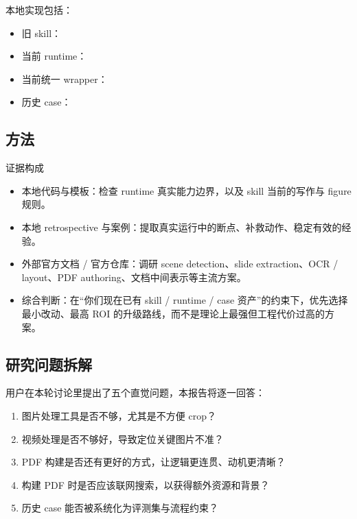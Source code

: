 \documentclass[a4paper]{article}
\begin{document}
本地实现包括：

\begin{itemize}
\item 旧 skill：
\item 当前 runtime：
\item 当前统一 wrapper：
\item 历史 case：
\end{itemize}

\subsection{方法}

\begin{methodbox}{证据构成}
\begin{itemize}
\item 本地代码与模板：检查 runtime 真实能力边界，以及 skill 当前的写作与 figure 规则。
\item 本地 retrospective 与案例：提取真实运行中的断点、补救动作、稳定有效的经验。
\item 外部官方文档 / 官方仓库：调研 scene detection、slide extraction、OCR / layout、PDF authoring、文档中间表示等主流方案。
\item 综合判断：在“你们现在已有 skill / runtime / case 资产”的约束下，优先选择最小改动、最高 ROI 的升级路线，而不是理论上最强但工程代价过高的方案。
\end{itemize}
\end{methodbox}

\subsection{研究问题拆解}

用户在本轮讨论里提出了五个直觉问题，本报告将逐一回答：

\begin{enumerate}
\item 图片处理工具是否不够，尤其是不方便 crop？
\item 视频处理是否不够好，导致定位关键图片不准？
\item PDF 构建是否还有更好的方式，让逻辑更连贯、动机更清晰？
\item 构建 PDF 时是否应该联网搜索，以获得额外资源和背景？
\item 历史 case 能否被系统化为评测集与流程约束？
\end{enumerate}
\end{document}
